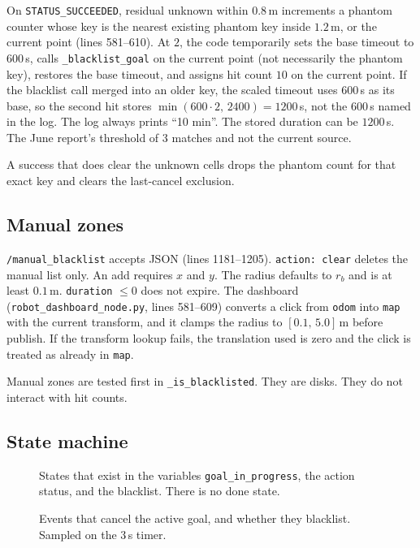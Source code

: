 \documentclass[11pt]{article}
\begin{document}
On \texttt{STATUS\_SUCCEEDED}, residual unknown within $0.8$\,m increments a phantom counter whose key is the nearest existing phantom key inside $1.2$\,m, or the current point (lines 581--610). At $2$, the code temporarily sets the base timeout to $600$\,s, calls \texttt{\_blacklist\_goal} on the current point (not necessarily the phantom key), restores the base timeout, and assigns hit count $10$ on the current point. If the blacklist call merged into an older key, the scaled timeout uses $600$\,s as its base, so the second hit stores $\min(600\cdot 2,\,2400)=1200$\,s, not the $600$\,s named in the log. The log always prints ``10 min''. The stored duration can be $1200$\,s. The June report's threshold of $3$ matches  and not the current source.

A success that does clear the unknown cells drops the phantom count for that exact key and clears the last-cancel exclusion.

\subsection{Manual zones}
\texttt{/manual\_blacklist} accepts JSON (lines 1181--1205). \texttt{action: clear} deletes the manual list only. An add requires $x$ and $y$. The radius defaults to $r_b$ and is at least $0.1$\,m. \texttt{duration} $\le 0$ does not expire. The dashboard (\texttt{robot\_dashboard\_node.py}, lines 581--609) converts a click from \texttt{odom} into \texttt{map} with the current transform, and it clamps the radius to $[0.1,\,5.0]$\,m before publish. If the transform lookup fails, the translation used is zero and the click is treated as already in \texttt{map}.

Manual zones are tested first in \texttt{\_is\_blacklisted}. They are disks. They do not interact with hit counts.

\subsection{State machine}
\begin{figure}[ht]
\centering
\FigLifecycle
\caption{States that exist in the variables \texttt{goal\_in\_progress}, the action status, and the blacklist. There is no done state.}
\label{fig:life}
\end{figure}

\begin{figure}[ht]
\centering
\FigRecovery
\caption{Events that cancel the active goal, and whether they blacklist. Sampled on the 3\,s timer.}
\label{fig:rec}
\end{figure}
\end{document}
